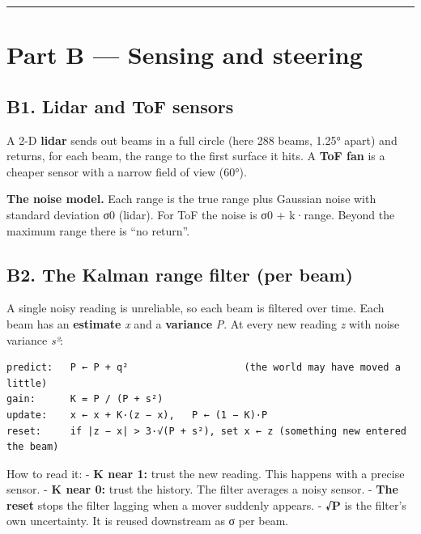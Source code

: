 \documentclass[
  10.5pt,
  a4paper,
]{article}
\begin{document}
\begin{center}\rule{0.5\linewidth}{0.5pt}\end{center}

\hypertarget{part-b-sensing-and-steering}{%
\section{Part B --- Sensing and
steering}\label{part-b-sensing-and-steering}}

\hypertarget{b1.-lidar-and-tof-sensors}{%
\subsection{B1. Lidar and ToF sensors}\label{b1.-lidar-and-tof-sensors}}

A 2-D \textbf{lidar} sends out beams in a full circle (here 288 beams,
1.25° apart) and returns, for each beam, the range to the first surface
it hits. A \textbf{ToF fan} is a cheaper sensor with a narrow field of
view (60°).

\textbf{The noise model.} Each range is the true range plus Gaussian
noise with standard deviation σ0 (lidar). For ToF the noise is σ0 +
k·range. Beyond the maximum range there is ``no return''.

\hypertarget{b2.-the-kalman-range-filter-per-beam}{%
\subsection{B2. The Kalman range filter (per
beam)}\label{b2.-the-kalman-range-filter-per-beam}}

A single noisy reading is unreliable, so each beam is filtered over
time. Each beam has an \textbf{estimate} \emph{x} and a
\textbf{variance} \emph{P}. At every new reading \emph{z} with noise
variance \emph{s²}:

\begin{verbatim}
predict:   P ← P + q²                    (the world may have moved a little)
gain:      K = P / (P + s²)
update:    x ← x + K·(z − x),   P ← (1 − K)·P
reset:     if |z − x| > 3·√(P + s²), set x ← z (something new entered the beam)
\end{verbatim}

How to read it: - \textbf{K near 1:} trust the new reading. This happens
with a precise sensor. - \textbf{K near 0:} trust the history. The
filter averages a noisy sensor. - \textbf{The reset} stops the filter
lagging when a mover suddenly appears. - \textbf{√P} is the filter's own
uncertainty. It is reused downstream as σ per beam.
\end{document}
